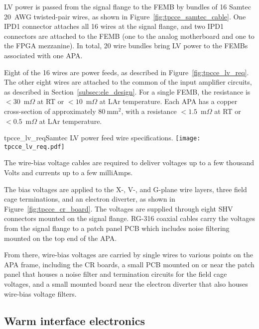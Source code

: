 LV power is passed from the signal flange to the FEMB by bundles of 16 Samtec 
20~AWG twisted-pair wires, as shown in Figure~\ref{fig:tpcce_samtec_cable}. One IPD1 connector
attaches all 16 wires at the signal flange, and two IPD1 connectors are attached to the FEMB (one to the
analog motherboard and one to the FPGA mezzanine). In total, 20 wire bundles 
 bring LV power to the FEMBs associated with one APA.

Eight of the 16 wires are power feeds, as described in Figure~\ref{fig:tpcce_lv_req}. The other eight wires
are attached to the common of the input amplifier circuits, as described in Section~\ref{subsec:ele_design}. For
a single FEMB, the resistance is $<30$~m$\Omega$ at RT or $<10$~m$\Omega$ at LAr temperature. Each APA has a copper cross-section of approximately $80~\mathrm{mm}^2$, with
a resistance $<1.5$~m$\Omega$ at RT or $<0.5$~m$\Omega$ at LAr temperature.

\begin{cdrfigure}{tpcce_lv_req}{Samtec LV power feed wire 
specifications.}
\texttt{[image: tpcce\_lv\_req.pdf]}
\end{cdrfigure}


The wire-bias voltage cables are required to deliver voltages up to a few thousand Volts and currents up to a few
milliAmps.

The bias voltages are applied to the X-, V-, and G-plane wire layers, three field cage terminations, 
and an electron diverter, as shown in Figure~\ref{fig:tpcce_cr_board}. The voltages are supplied 
through eight SHV connectors mounted on the signal flange. RG-316 coaxial cables carry the voltages 
from the signal flange to a patch panel PCB which includes noise filtering mounted on the top 
end of the APA. 

From there, wire-bias voltages are carried by single wires to 
various points on the APA frame, including the CR boards, a small PCB mounted on or near 
the patch panel that houses a noise filter and termination circuits for the field cage voltages, and 
a small mounted board near the electron diverter that also houses wire-bias voltage filters.


\subsection{Warm interface electronics}
\label{subsec:warm_interface_elec}

